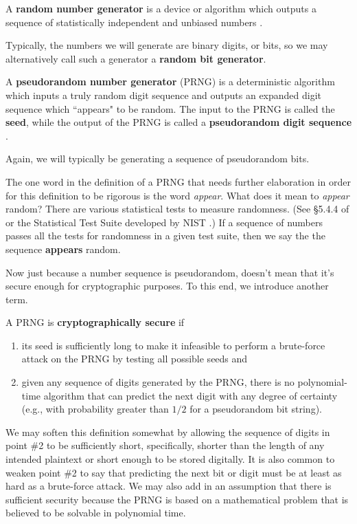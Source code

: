 \begin{definition}
A {\bf random number generator}  is a device or algorithm which outputs a sequence of statistically independent and unbiased numbers \cite{hac}.
\end{definition}
Typically, the numbers we will generate are binary digits, or bits, so we may alternatively call such a generator a {\bf random bit generator}.

\begin{definition}
A {\bf pseudorandom number generator}  (PRNG) is a deterministic algorithm which inputs a truly random digit sequence and outputs an expanded digit sequence which ``appears" to be random. The input to the PRNG is called the {\bf seed},  while the output of the PRNG is called a {\bf pseudorandom digit sequence} \cite{hac}.
\end{definition}
Again, we will typically be generating a sequence of pseudorandom bits.

The one word in the definition of a PRNG that needs further elaboration in order for this definition to be rigorous is the word {\em appear}. What does it mean to {\em appear} random? There are various statistical tests to measure randomness. (See \S5.4.4 of \cite{hac} or the Statistical Test Suite developed by NIST \cite{nist}.) If a sequence of numbers passes all the tests for randomness in a given test suite, then we say the the sequence {\bf appears} random.

Now just because a number sequence is pseudorandom, doesn't mean that it's secure enough for cryptographic purposes. To this end, we introduce another term.

\begin{definition}
A PRNG is {\bf cryptographically secure}  if
	\begin{enumerate}
		\item its seed  is sufficiently long to make it infeasible to perform a brute-force attack on the PRNG by testing all possible seeds and
		\item given any sequence of digits generated by the PRNG, there is no polynomial-time algorithm that can predict the next digit with any degree of certainty (e.g., with probability greater than $1/2$ for a pseudorandom bit string).
	\end{enumerate}
We may soften this definition somewhat by allowing the sequence of digits in point \#2 to be sufficiently short, specifically, shorter than the length of any intended plaintext or short enough to be stored digitally. It is also common to weaken point \#2 to say that predicting the next bit or digit must be at least as hard as a brute-force attack. We may also add in an assumption that there is sufficient security because the PRNG is based on a mathematical problem that is believed to be solvable in polynomial time.
\end{definition}

